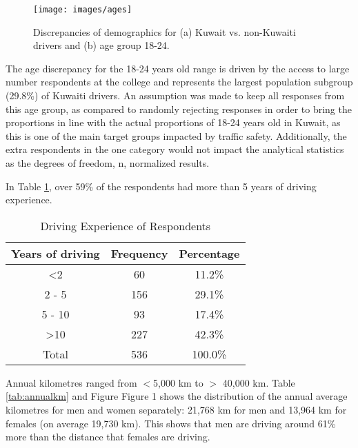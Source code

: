 \documentclass[preprint,12pt,a4paper,authoryear]{elsarticle}
\begin{document}
\begin{figure}[H]
\centering
\texttt{[image: images/ages]}  %
\caption{Discrepancies of demographics for (a) Kuwait vs. non-Kuwaiti drivers and (b) age group 18-24.}
\label{fig:differences}
\end{figure}
%
The age discrepancy for the 18-24 years old range is driven by the access to large number respondents at the college and represents the largest population subgroup (29.8\%)  of Kuwaiti drivers. An assumption was made to keep all responses from this age group, as compared to randomly rejecting responses in order to bring the proportions in line with the actual proportions of 18-24 years old in Kuwait, as this is one of the main target groups impacted by traffic safety. Additionally, the extra respondents in the one category would not impact the analytical statistics as the degrees of freedom, n, normalized results.

In Table \ref{tab:drive-exp}, over 59\% of the respondents had more than 5 years of driving experience.

\begin{table}[H]
\centering
\caption{Driving Experience of Respondents}
\label{tab:drive-exp}
\begin{tabular}{@{}ccc@{}}
\toprule
\textbf{Years of driving} & \textbf{Frequency} & \textbf{Percentage} \\ \midrule
\textless 2 & 60 & 11.2\% \\
2 - 5 & 156 & 29.1\% \\
5 - 10 & 93 & 17.4\% \\
\textgreater10 & 227 & 42.3\% \\
Total & 536 & 100.0\% \\ \bottomrule
\end{tabular}
\end{table}

Annual kilometres ranged from $<$5,000 km to $>$ 40,000 km. Table \ref{tab:annualkm} and Figure Figure 1 shows the distribution of the annual average kilometres for men and women separately: 21,768 km for men and 13,964 km for females (on average 19,730 km). This shows that men are driving around 61\% more than the distance that females are driving.
\end{document}
